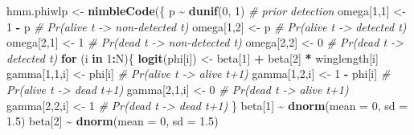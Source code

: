 \documentclass[
  12pt,
]{krantz}
\newenvironment{Shaded}{\begin{snugshade}}{\end{snugshade}}
\newcommand{\AttributeTok}[1]{\textcolor[rgb]{0.13,0.29,0.53}{#1}}
\newcommand{\CommentTok}[1]{\textcolor[rgb]{0.56,0.35,0.01}{\textit{#1}}}
\newcommand{\ControlFlowTok}[1]{\textcolor[rgb]{0.13,0.29,0.53}{\textbf{#1}}}
\newcommand{\DecValTok}[1]{\textcolor[rgb]{0.00,0.00,0.81}{#1}}
\newcommand{\FloatTok}[1]{\textcolor[rgb]{0.00,0.00,0.81}{#1}}
\newcommand{\FunctionTok}[1]{\textcolor[rgb]{0.13,0.29,0.53}{\textbf{#1}}}
\newcommand{\NormalTok}[1]{#1}
\newcommand{\OtherTok}[1]{\textcolor[rgb]{0.56,0.35,0.01}{#1}}
\newcommand{\SpecialCharTok}[1]{\textcolor[rgb]{0.81,0.36,0.00}{\textbf{#1}}}
\begin{document}
\begin{Shaded}
\begin{Highlighting}[]
\NormalTok{hmm.phiwlp }\OtherTok{\textless{}{-}} \FunctionTok{nimbleCode}\NormalTok{(\{}
\NormalTok{    p }\SpecialCharTok{\textasciitilde{}} \FunctionTok{dunif}\NormalTok{(}\DecValTok{0}\NormalTok{, }\DecValTok{1}\NormalTok{) }\CommentTok{\# prior detection}
\NormalTok{    omega[}\DecValTok{1}\NormalTok{,}\DecValTok{1}\NormalTok{] }\OtherTok{\textless{}{-}} \DecValTok{1} \SpecialCharTok{{-}}\NormalTok{ p    }\CommentTok{\# Pr(alive t {-}\textgreater{} non{-}detected t)}
\NormalTok{    omega[}\DecValTok{1}\NormalTok{,}\DecValTok{2}\NormalTok{] }\OtherTok{\textless{}{-}}\NormalTok{ p        }\CommentTok{\# Pr(alive t {-}\textgreater{} detected t)}
\NormalTok{    omega[}\DecValTok{2}\NormalTok{,}\DecValTok{1}\NormalTok{] }\OtherTok{\textless{}{-}} \DecValTok{1}        \CommentTok{\# Pr(dead t {-}\textgreater{} non{-}detected t)}
\NormalTok{    omega[}\DecValTok{2}\NormalTok{,}\DecValTok{2}\NormalTok{] }\OtherTok{\textless{}{-}} \DecValTok{0}        \CommentTok{\# Pr(dead t {-}\textgreater{} detected t)}
  \ControlFlowTok{for}\NormalTok{ (i }\ControlFlowTok{in} \DecValTok{1}\SpecialCharTok{:}\NormalTok{N)\{}
    \FunctionTok{logit}\NormalTok{(phi[i]) }\OtherTok{\textless{}{-}}\NormalTok{ beta[}\DecValTok{1}\NormalTok{] }\SpecialCharTok{+}\NormalTok{ beta[}\DecValTok{2}\NormalTok{] }\SpecialCharTok{*}\NormalTok{ winglength[i]}
\NormalTok{    gamma[}\DecValTok{1}\NormalTok{,}\DecValTok{1}\NormalTok{,i] }\OtherTok{\textless{}{-}}\NormalTok{ phi[i]      }\CommentTok{\# Pr(alive t {-}\textgreater{} alive t+1)}
\NormalTok{    gamma[}\DecValTok{1}\NormalTok{,}\DecValTok{2}\NormalTok{,i] }\OtherTok{\textless{}{-}} \DecValTok{1} \SpecialCharTok{{-}}\NormalTok{ phi[i]  }\CommentTok{\# Pr(alive t {-}\textgreater{} dead t+1)}
\NormalTok{    gamma[}\DecValTok{2}\NormalTok{,}\DecValTok{1}\NormalTok{,i] }\OtherTok{\textless{}{-}} \DecValTok{0}           \CommentTok{\# Pr(dead t {-}\textgreater{} alive t+1)}
\NormalTok{    gamma[}\DecValTok{2}\NormalTok{,}\DecValTok{2}\NormalTok{,i] }\OtherTok{\textless{}{-}} \DecValTok{1}           \CommentTok{\# Pr(dead t {-}\textgreater{} dead t+1)}
\NormalTok{  \}}
\NormalTok{  beta[}\DecValTok{1}\NormalTok{] }\SpecialCharTok{\textasciitilde{}} \FunctionTok{dnorm}\NormalTok{(}\AttributeTok{mean =} \DecValTok{0}\NormalTok{, }\AttributeTok{sd =} \FloatTok{1.5}\NormalTok{)}
\NormalTok{  beta[}\DecValTok{2}\NormalTok{] }\SpecialCharTok{\textasciitilde{}} \FunctionTok{dnorm}\NormalTok{(}\AttributeTok{mean =} \DecValTok{0}\NormalTok{, }\AttributeTok{sd =} \FloatTok{1.5}\NormalTok{)}

\end{Highlighting}
\end{Shaded}
\end{document}
